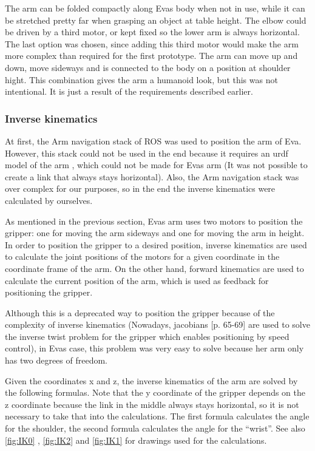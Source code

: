 \documentclass[project_eva.tex]{subfiles}
\begin{document}
The arm can be folded compactly along Eva\textquotesingle s body when not in use, while it can be stretched pretty far 
when grasping an object at table height. The elbow could be driven by a third motor, or kept fixed so the lower arm is 
always horizontal. The last option was chosen, since adding this third motor would make the arm more complex than 
required for the first prototype. The arm can move up and down, move sideways and is connected to the body on a position 
at shoulder hight. This combination gives the arm a humanoid look, but this was not intentional. It is just a result of 
the requirements described earlier.

\subsubsection*{Inverse kinematics}
At first, the Arm navigation stack of ROS was used to position the arm of Eva. However, this stack could not be used in 
the end because it requires an urdf model of the arm \cite{urdf}, which could not be made for Eva\textquotesingle s arm 
(It was not possible to create a link that always stays horizontal). Also, the Arm navigation stack was over complex for 
our purposes, so in the end the inverse kinematics were calculated by ourselves.  

As mentioned in the previous section, Eva\textquotesingle s arm uses two motors to position the gripper: one for moving 
the arm sideways and one for moving the arm in height. In order to position the gripper to a desired position, inverse 
kinematics are used to calculate the joint positions of the motors for a given coordinate in the coordinate frame of the 
arm. On the other hand, forward kinematics are used to calculate the current position of the arm, which is used as 
feedback for positioning the gripper. 

Although this is a deprecated way to position the gripper because of the complexity of inverse kinematics  (Nowadays, 
jacobians \cite{jacobian} [p. 65-69] are used to solve the inverse twist 
problem for the gripper which enables positioning by speed control), in Eva\textquotesingle s case, this problem was 
very easy to solve because her arm only has two degrees of freedom. 

Given the coordinates x and z, the inverse kinematics of the arm are solved by the following formulas. Note that the y 
coordinate of the gripper depends on the z coordinate because the link in the middle always stays horizontal, so it is 
not necessary to take that into the calculations. The first formula calculates the angle for the shoulder, the second 
formula calculates the angle for the ``wrist''. See also \ref{fig:IK0} , \ref{fig:IK2} and \ref{fig:IK1} for drawings 
used for the calculations.
\end{document}
